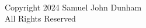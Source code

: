 \chapter*{}
\hspace{1em}\vspace{18em} \\ %
\begin{center}
  Copyright {\textcopyright} 2024 Samuel John Dunham \\
  All Rights Reserved
\end{center}
